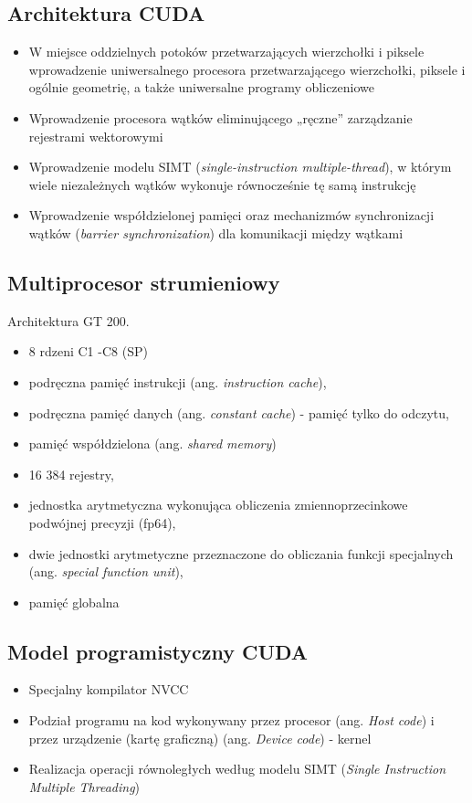 	\subsection{Architektura CUDA}
		\begin{itemize}
			\item W miejsce oddzielnych potoków przetwarzających wierzchołki i piksele wprowadzenie uniwersalnego procesora przetwarzającego wierzchołki, piksele i ogólnie geometrię, a także uniwersalne programy obliczeniowe
			\item Wprowadzenie procesora wątków eliminującego „ręczne” zarządzanie rejestrami wektorowymi
			\item Wprowadzenie modelu SIMT (\emph{single-instruction multiple-thread}), w którym wiele niezależnych wątków wykonuje równocześnie tę samą instrukcję
			\item Wprowadzenie współdzielonej pamięci oraz mechanizmów synchronizacji wątków (\emph{barrier synchronization}) dla komunikacji między wątkami
		\end{itemize}
	\subsection{Multiprocesor strumieniowy}
		Architektura GT 200.
		\begin{itemize}
			\item 8 rdzeni C1 -C8 (SP)
			\item podręczna pamięć instrukcji (ang. \emph{instruction cache}),
			\item podręczna pamięć danych (ang. \emph{constant cache}) - pamięć tylko do odczytu,
			\item pamięć współdzielona (ang. \emph{shared memory})
			\item 16 384 rejestry,
			\item jednostka arytmetyczna wykonująca obliczenia zmiennoprzecinkowe podwójnej precyzji (fp64),
			\item dwie jednostki arytmetyczne przeznaczone do obliczania funkcji specjalnych (ang. \emph{special function unit}),
			\item pamięć globalna
		\end{itemize}
	\subsection{Model programistyczny CUDA}
		\begin{itemize}
			\item Specjalny kompilator NVCC
			\item Podział programu na kod wykonywany przez procesor (ang. \emph{Host code}) i przez urządzenie (kartę graficzną) (ang. \emph{Device code}) - kernel
			\item Realizacja operacji równoległych według modelu SIMT (\emph{Single Instruction Multiple Threading})
		\end{itemize}
